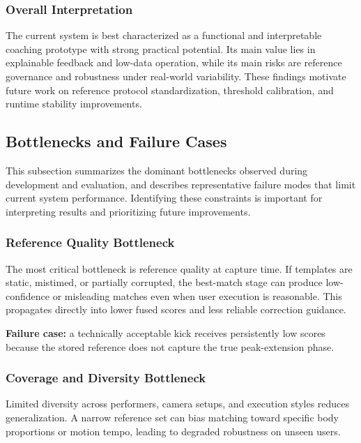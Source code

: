 \documentclass[12pt]{article}
\begin{document}
{\subsubsection{Overall Interpretation}

The current system is best characterized as a functional and interpretable coaching prototype with strong practical potential. Its main value lies in explainable feedback and low-data operation, while its main risks are reference governance and robustness under real-world variability. These findings motivate future work on reference protocol standardization, threshold calibration, and runtime stability improvements.

\subsection{Bottlenecks and Failure Cases}

This subsection summarizes the dominant bottlenecks observed during development and evaluation, and describes representative failure modes that limit current system performance. Identifying these constraints is important for interpreting results and prioritizing future improvements.

\subsubsection{Reference Quality Bottleneck}

The most critical bottleneck is reference quality at capture time. If templates are static, mistimed, or partially corrupted, the best-match stage can produce low-confidence or misleading matches even when user execution is reasonable. This propagates directly into lower fused scores and less reliable correction guidance.

\textbf{Failure case:} a technically acceptable kick receives persistently low scores because the stored reference does not capture the true peak-extension phase.

\subsubsection{Coverage and Diversity Bottleneck}

Limited diversity across performers, camera setups, and execution styles reduces generalization. A narrow reference set can bias matching toward specific body proportions or motion tempo, leading to degraded robustness on unseen users.

}
\end{document}

